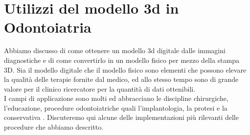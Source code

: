 
\chapter{Utilizzi del modello 3d in Odontoiatria} %

\label{Chapter6} %

 
 
Abbiamo discusso di come ottenere un modello 3d digitale dalle immagini diagnostiche e di come convertirlo in un modello fisico per mezzo della stampa 3D. Sia il modello digitale che il modello fisico sono elementi che possono elevare la qualità delle terapie fornite dal medico, ed allo stesso tempo sono di grande valore per il clinico ricercatore per la quantità di dati ottenibili.\\
I campi di applicazione sono molti ed abbracciano le discipline chirurgiche, l'educazione, procedure odontoiatriche quali l'implantologia, la protesi e la conservativa \parencite{Reference103}.
Discuteremo qui alcune delle implementazioni più rilevanti delle procedure che abbiamo descritto.

